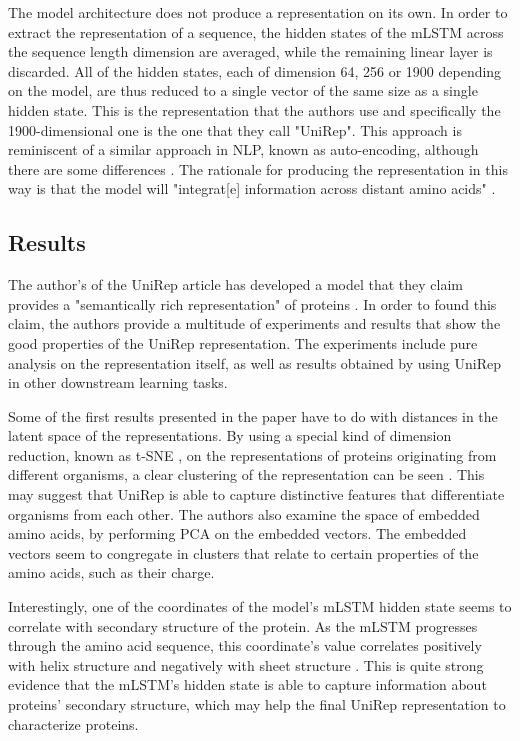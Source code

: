 \documentclass[a4paper,12pt]{article}
\begin{document}
The model architecture does not produce a representation on its own. In order to extract the representation of a sequence, the hidden states of the mLSTM across the sequence length dimension are averaged, while the remaining linear layer is discarded. All of the hidden states, each of dimension 64, 256 or 1900 depending on the model, are thus reduced to a single vector of the same size as a single hidden state. This is the representation that the authors use and specifically the 1900-dimensional one is the one that they call "UniRep". This approach is reminiscent of a similar approach in NLP, known as auto-encoding, although there are some differences . The rationale for producing the representation in this way is that the model will "integrat[e] information across distant amino acids" \cite[p. 9]{alley2019unified}.


\subsection{Results}

The author's of the UniRep article has developed a model that they claim provides a "semantically rich representation" of proteins . In order to found this claim, the authors provide a multitude of experiments and results that show the good properties of the UniRep representation. The experiments include pure analysis on the representation itself, as well as results obtained by using UniRep in other downstream learning tasks.

Some of the first results presented in the paper have to do with distances in the latent space of the representations. By using a special kind of dimension reduction, known as t-SNE , on the representations of proteins originating from different organisms, a clear clustering of the representation can be seen \cite[fig. 2b]{alley2019unified}. This may suggest that UniRep is able to capture distinctive features that differentiate organisms from each other. The authors also examine the space of embedded amino acids, by performing PCA on the embedded vectors. The embedded vectors seem to congregate in clusters that relate to certain properties of the amino acids, such as their charge.

Interestingly, one of the coordinates of the model's mLSTM hidden state seems to correlate with secondary structure of the protein. As the mLSTM progresses through the amino acid sequence, this coordinate's value correlates positively with helix structure and negatively with sheet structure \cite[fig. 2e]{alley2019unified}. This is quite strong evidence that the mLSTM's hidden state is able to capture information about proteins' secondary structure, which may help the final UniRep representation to characterize proteins.
\end{document}
